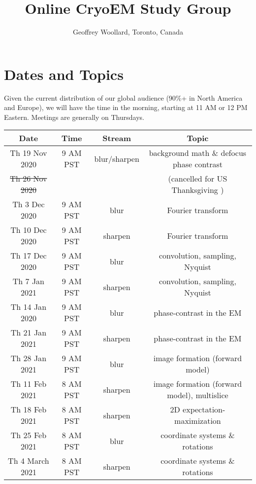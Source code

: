 \documentclass[11pt, oneside]{article}   	%
\title{Online CryoEM Study Group}
\author{Geoffrey Woollard, Toronto, Canada}
\begin{document}
\maketitle

\tableofcontents



\pagebreak
\section{Dates and Topics}
Given the current distribution of our global audience (90\%+  in North America and Europe), we will have the time in the morning, starting at 11 AM or 12 PM Eastern. Meetings are generally on Thursdays.

\begin{center}
\small
 \begin{tabular}{|| c c c c||} 
 \hline
 Date & Time & Stream & Topic \\ [0.5ex] 
 \hline\hline
Th 19 Nov 2020 & \tiny{9 AM PST} &  blur/sharpen & background math \& defocus phase contrast  \\ 
 \hline
\sout{Th 26 Nov 2020}  &   & & (cancelled for US Thanksgiving )    \\ 
 \hline
Th 3 Dec 2020 & \tiny{9 AM PST} & blur & Fourier transform   \\ 
 \hline
Th 10 Dec 2020 & \tiny{9 AM PST} & sharpen & Fourier transform   \\ 
 \hline
Th 17 Dec 2020 & \tiny{9 AM PST} & blur & convolution, sampling, Nyquist   \\ 
 \hline
Th 7 Jan 2021 & \tiny{9 AM PST} & sharpen & convolution, sampling, Nyquist   \\ 
 \hline
Th 14 Jan 2020 & \tiny{9 AM PST} & blur & phase-contrast in the EM   \\ 
 \hline
Th 21 Jan 2021 & \tiny{9 AM PST} & sharpen & phase-contrast in the EM   \\ 
 \hline
Th 28 Jan 2021 & \tiny{9 AM PST} & blur & image formation (forward model)   \\ 
 \hline
Th 11 Feb 2021 & \tiny{8 AM PST} & sharpen & image formation (forward model), multislice   \\ 
 \hline
Th 18 Feb 2021 & \tiny{8 AM PST} & sharpen &  2D expectation-maximization \\ 
 \hline
Th 25 Feb 2021 & \tiny{8 AM PST} & blur & coordinate systems \& rotations  \\ 
 \hline
 Th 4 March 2021 & \tiny{8 AM PST} & sharpen & coordinate systems \& rotations  \\ 

\end{tabular}
\end{center}
\end{document}

